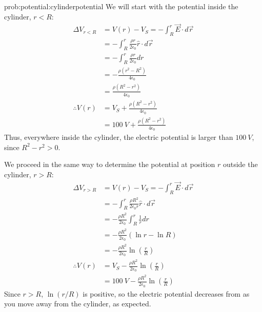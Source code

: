 \begin{solution}{prob:potential:cylinderpotential}
We will start with the potential inside the cylinder, $r<R$:
\begin{align*}
\Delta V_{r<R} &= V(r)-V_S = -\int_{R}^{r} \vec E\cdot d \vec r\\
&= -\int_{R}^{r} \frac{\rho r}{2\epsilon_0} \hat r \cdot d \vec r\\
&= -\int_{R}^{r} \frac{\rho r}{2\epsilon_0} dr\\
&= -\frac{\rho (r^2-R^2)}{4\epsilon_0}\\
&= \frac{\rho (R^2-r^2)}{4\epsilon_0}\\
\therefore V(r) &= V_S + \frac{\rho (R^2-r^2)}{4\epsilon_0}\\
&=\SI{100}{V}+\frac{\rho (R^2-r^2)}{4\epsilon_0}
\end{align*}
Thus, everywhere inside the cylinder, the electric potential is larger than $\SI{100}{V}$, since $R^2-r^2>0$. 

We proceed in the same way to determine the potential at position $r$ outside the cylinder, $r>R$:
\begin{align*}
\Delta V_{r>R} &=  V(r) - V_S = -\int_{R}^{r} \vec E\cdot d \vec r\\
&= -\int_{R}^{r} \frac{\rho R^2}{2\epsilon_0r} \hat r \cdot d \vec r\\
&= - \frac{\rho R^2}{2\epsilon_0} \int_{R}^{r} \frac{1}{r}dr\\
&=- \frac{\rho R^2}{2\epsilon_0}(\ln r-\ln R)\\
&=- \frac{\rho R^2}{2\epsilon_0}\ln\left( \frac{r}{R} \right)\\
\therefore V(r) &= V_S - \frac{\rho R^2}{2\epsilon_0} \ln \left( \frac{r}{R} \right)\\
&= \SI{100}{V} - \frac{\rho R^2}{2\epsilon_0} \ln \left( \frac{r}{R} \right)
\end{align*}
Since $r>R$, $\ln (r/R)$ is positive, so the electric potential decreases from as you move away from the cylinder, as expected.
\end{solution}

